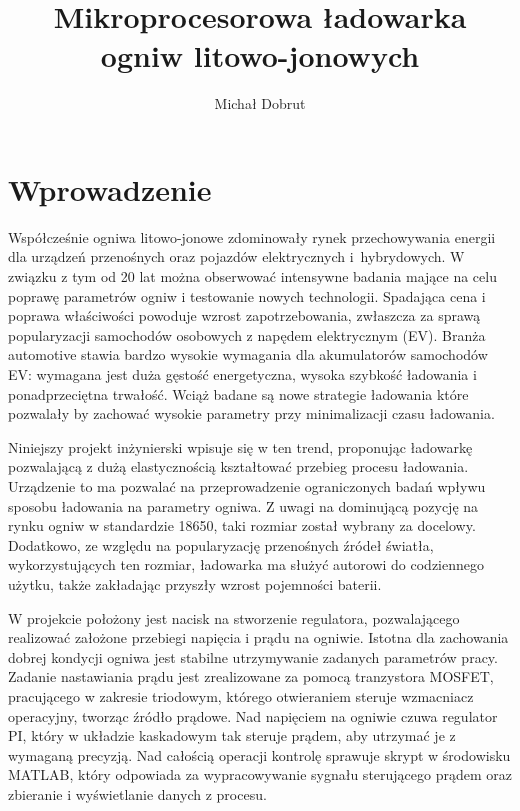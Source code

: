 \documentclass[polish,engineer]{polsl-msth}
\author{Michał Dobrut}
\title{Mikroprocesorowa ładowarka ogniw litowo-jonowych}
\begin{document}
\frontmatter
\maketitle
\makestatement
\tableofcontents
\listoftables
\listoffigures
\mainmatter

\usepackage{color}
\newcommand{\remark}[1]{{[\color{GREEN}\emph{\footnotesize #1}{}]}}

\chapter{Wprowadzenie}

Współcześnie ogniwa litowo-jonowe zdominowały rynek przechowywania energii dla urządzeń przenośnych oraz pojazdów elektrycznych i~hybrydowych. W związku z tym od 20 lat można obserwować intensywne badania mające na celu poprawę parametrów ogniw i testowanie nowych technologii. Spadająca cena i poprawa właściwości powoduje wzrost zapotrzebowania, zwłaszcza za sprawą popularyzacji samochodów osobowych z napędem elektrycznym (EV). Branża automotive stawia bardzo wysokie wymagania dla akumulatorów samochodów EV: wymagana jest duża gęstość energetyczna, wysoka szybkość ładowania i ponadprzeciętna trwałość. Wciąż badane są nowe strategie ładowania które pozwalały by zachować wysokie parametry przy minimalizacji czasu ładowania.

Niniejszy projekt inżynierski wpisuje się w ten trend, proponując ładowarkę pozwalającą z dużą elastycznością kształtować przebieg procesu ładowania. Urządzenie to ma pozwalać na przeprowadzenie ograniczonych badań wpływu sposobu ładowania na parametry ogniwa. Z uwagi na dominującą pozycję na rynku ogniw w standardzie 18650, taki rozmiar został wybrany za docelowy. Dodatkowo, ze względu na popularyzację przenośnych źródeł światła, wykorzystujących ten rozmiar, ładowarka ma służyć autorowi do codziennego użytku, także zakładając przyszły wzrost pojemności baterii.

W projekcie położony jest nacisk na stworzenie regulatora, pozwalającego realizować założone przebiegi napięcia i prądu na ogniwie. Istotna dla zachowania dobrej kondycji ogniwa jest stabilne utrzymywanie zadanych parametrów pracy. Zadanie nastawiania prądu jest zrealizowane za pomocą tranzystora MOSFET, pracującego w zakresie triodowym, którego otwieraniem steruje wzmacniacz operacyjny, tworząc źródło prądowe. Nad napięciem na ogniwie czuwa regulator PI, który w układzie kaskadowym tak steruje prądem, aby utrzymać je z wymaganą precyzją. Nad całością operacji kontrolę sprawuje skrypt w środowisku MATLAB, który odpowiada za wypracowywanie sygnału sterującego prądem oraz zbieranie i wyświetlanie danych z procesu.
\end{document}
